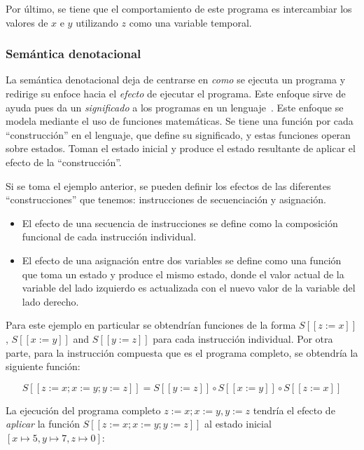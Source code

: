 Por último, se tiene que el comportamiento de este programa es intercambiar los valores de $x$ e $y$ utilizando $z$ como una variable temporal.


\subsubsection*{Semántica denotacional}
La semántica denotacional deja de centrarse en \textit{como} se ejecuta un programa y redirige su enfoce hacia el \textit{efecto} de ejecutar el programa.
Este enfoque sirve de ayuda pues da un \textit{significado} a los programas en un lenguaje~\cite{nipkow}.
Este enfoque se modela mediante el uso de funciones matemáticas.
Se tiene una función por cada ``construcción'' en el lenguaje, que define su significado, y estas funciones operan sobre estados.
Toman el estado inicial y produce el estado resultante de aplicar el efecto de la ``construcción''.
\begin{comment}
FIXME Construcción no es la palabra.
\end{comment}

Si se toma el ejemplo anterior, se pueden definir los efectos de las diferentes ``construcciones'' que tenemos: instrucciones de secuenciación y asignación.

\begin{itemize}
\item{El efecto de una secuencia de instrucciones se define como la composición funcional de cada instrucción individual.}
\item{El efecto de una asignación entre dos variables se define como una función que toma un estado y produce el mismo estado, donde el valor actual de la variable del lado izquierdo es actualizada con el nuevo valor de la variable del lado derecho.}
\end{itemize}

Para este ejemplo en particular se obtendrían funciones de la forma $S [\![ z:=x ]\!]$, $S [\![ x:=y ]\!]$ and $S [\![ y:=z ]\!]$ para cada instrucción individual.
Por otra parte, para la instrucción compuesta que es el programa completo, se obtendría la siguiente función:

\begin{equation*}
S [\![ z:=x; x:=y; y:=z ]\!] = S [\![ y:=z ]\!] \circ S [\![ x:=y ]\!] \circ S [\![ z:=x ]\!]
\end{equation*}

La ejecución del programa completo $z:=x; x:=y, y:=z$ tendría el efecto de \textit{aplicar} la función $S [\![ z:=x; x:=y; y:=z ]\!]$ al estado inicial $[x\mapsto5, y\mapsto7, z\mapsto0]$:

